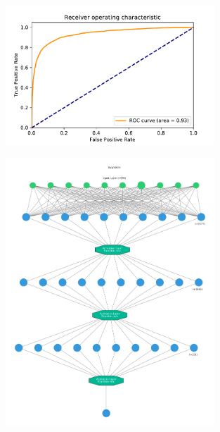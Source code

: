 \documentclass[aspectratio=1610, professionalfonts, 9pt]{beamer}
\begin{document}
  \begin{frame}
    \begin{figure}
        \includegraphics[width=0.7\textwidth]{pictures/bow/RF/roc_Hyperopt_bow_best_nn.pdf}
        \caption{}
        \label{}
    \end{figure}
  \end{frame}
  \begin{frame}
    \begin{figure}
        \includegraphics[angle=90,width=0.7\textwidth]{pictures/bow/bow_dnn_graph.pdf}
        \caption{}
        \label{}
    \end{figure}
  \end{frame}
  \begin{frame}
    \printbibliography
  \end{frame}
\end{document}

